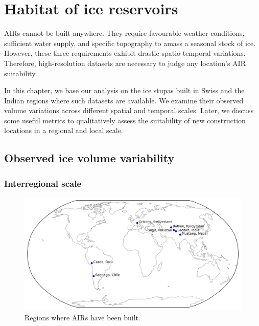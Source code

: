 \chapter{Habitat of ice reservoirs}


AIRs cannot be built anywhere. They require favourable weather conditions, sufficient water supply, and specific
topography to amass a seasonal stock of ice. However, these three requirements exhibit drastic
spatio-temporal variations. Therefore, high-resolution datasets are necessary to judge any location's AIR
suitability. 

In this chapter, we base our analysis on the ice stupas built in Swiss and the Indian regions where such
datasets are available. We examine their observed volume variations across different spatial and temporal scales.
Later, we discuss some useful metrics to qualitatively assess the suitability of new construction locations in a
regional and local scale.

\section{Observed ice volume variability}

\subsection{Interregional scale}

\begin{figure}[htb]
\centering
\includegraphics[width=\textwidth]{figs/air_regions.jpg}
\caption{Regions where AIRs have been built.}
\label{fig:AIR_regions}
\end{figure}

